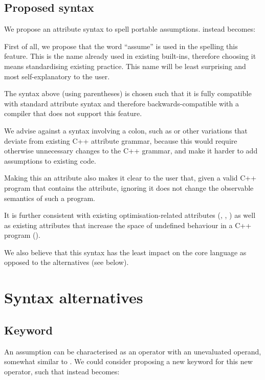 \subsection{Proposed syntax}

We propose an attribute syntax to spell portable assumptions.  instead becomes:

\forceindent
{}

First of all, we propose that the word ``assume'' is used in the spelling this feature. This is the name already used in existing built-ins, therefore choosing it means standardising existing practice. This name will be least surprising and most self-explanatory to the user.

The syntax above (using parentheses) is chosen such that it is fully compatible with standard attribute syntax and therefore backwards-compatible with a compiler that does not support this feature. 

We advise against a syntax involving a colon, such as  or other variations that deviate from existing C++ attribute grammar, because this would require otherwise unnecessary changes to the C++ grammar, and make it harder to add assumptions to existing code.

Making this an attribute also makes it clear to the user that, given a valid C++ program that contains the attribute, ignoring it does not change the observable semantics of such a program.

It is further consistent with existing optimisation-related attributes (\tcode{[[likely]]}, \tcode{[[unlikely]]}, ) as well as existing attributes that increase the space of undefined behaviour in a C++ program (\tcode{[[noreturn]]}).

We also believe that this syntax has the least impact on the core language as opposed to the alternatives (see below).

\section{Syntax alternatives}

\subsection{Keyword}

An assumption can be characterised as an operator with an unevaluated operand, somewhat similar to . We could consider proposing a new keyword for this new operator, such that  instead becomes:

